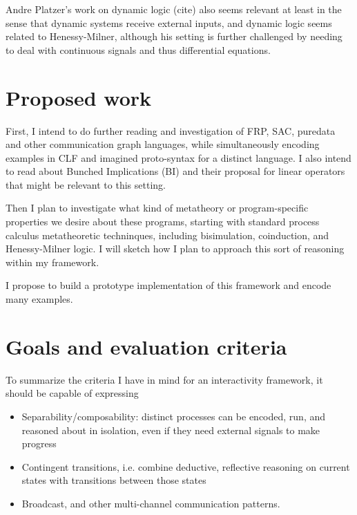 \documentclass{article}
\begin{document}
Andre Platzer's work on dynamic logic (cite) also seems relevant at least
in the sense that dynamic systems receive external inputs, and dynamic
logic seems related to Henessy-Milner, although his setting is further
challenged by needing to deal with continuous signals and thus differential
equations.

\section{Proposed work}

First, I intend to do further reading and investigation of FRP, SAC,
puredata and other communication graph languages, while simultaneously
encoding examples in CLF and imagined proto-syntax for a distinct language.
I also intend to read about Bunched Implications (BI) and their proposal
for linear operators that might be relevant to this setting.

Then I plan to investigate what kind of metatheory or program-specific
properties we desire about these programs, starting with standard process
calculus metatheoretic techninques, including bisimulation, coinduction,
and Henessy-Milner logic. I will sketch how I plan to approach this sort of
reasoning within my framework.

I propose to build a prototype implementation of this framework and encode
many examples.

\section{Goals and evaluation criteria}

To summarize the criteria I have in mind for an interactivity framework, it
should be capable of expressing
\begin{itemize}
\item Separability/composability: distinct processes can be encoded, run,
and reasoned about in isolation, even if they need external signals to make
progress
\item Contingent transitions, i.e. combine deductive, reflective reasoning
on current states with transitions between those states
\item Broadcast, and other multi-channel communication patterns.
\end{itemize}

\end{document}
